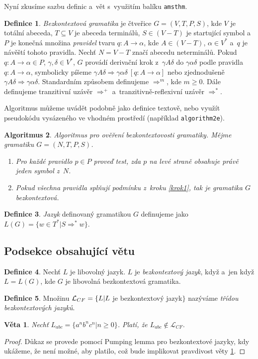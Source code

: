 \documentclass[a4paper, twocolumn, 11pt]{article}
\theoremstyle{definition}
\newtheorem{definice}{Definice}[section]
\theoremstyle{plain}
\newtheorem{algoritmus}[definice]{Algoritmus}
\theoremstyle{plain}
\newtheorem{veta}{Věta}
\begin{document}
	Nyní zkusíme sazbu definic a~vět s~využitím balíku \texttt{amsthm}.
	\begin{definice} \label{def:bezkont_gram}
		\emph{ Bezkontextová gramatika} je čtveřice $G=(V,T,P,S)$, kde $V$ je totální abeceda,
		$T \subseteq V$ je abeceda terminálů, $S \in (V - T)$ je startující symbol a~$P$ je konečná množina \emph{pravidel}
		tvaru $q\colon A \rightarrow \alpha$, kde $A \in (V - T)$, 
		$\alpha \in V^*$ a~$q$ je návěští tohoto pravidla. Nechť $N=V-T$ značí abecedu neterminálů.
		Pokud $q\colon A \rightarrow \alpha \in P$, $\gamma, \delta \in V^*$, $G$ provádí derivační krok z~$\gamma A \delta$ do $\gamma \alpha \delta$ podle pravidla $q \colon A \rightarrow \alpha$, sym\-bo\-li\-cky píšeme 
		$\gamma A \delta \Rightarrow \gamma \alpha \delta \ [q \colon A \rightarrow \alpha]$ nebo zjed\-nodušeně $\gamma A \delta \Rightarrow \gamma \alpha \delta$. Standardním způsobem definu\-jeme $\Rightarrow ^m$, kde $m \ge 0$. Dále definujeme 
		tranzitivní uzávěr $\Rightarrow ^+$ a~tranzitivně-reflexivní uzávěr $\Rightarrow ^*$.
	\end{definice}

	Algoritmus můžeme uvádět podobně jako definice \mbox{textově}, nebo využít pseudokódu vysázeného ve vhodném prostředí (například \texttt{algorithm2e}).

	\begin{algoritmus}
		Algoritmus pro ověření bezkontextovosti gramatiky. Mějme gramatiku $G = (N,T,P,S)$.
		\begin{enumerate}
			\item\label{krok1} Pro každé pravidlo $p \in P$ proveď test, zda $p$ na levé straně obsahuje právě jeden symbol z~$N$.
			\item Pokud všechna pravidla splňují podmínku z~kroku \ref{krok1}, tak je gramatika $G$ bezkontextová.
		\end{enumerate}
	\end{algoritmus}
	\begin{definice}
		\emph{ Jazyk} definovaný gramatikou $G$ definujeme jako $L(G)=\{w \in T^*|S \Rightarrow ^* w\}$.
	\end{definice}
	\subsection{Podsekce obsahující větu}
		\begin{definice}
			Nechť $L$ je libovolný jazyk. $L$ je \emph{bezkontextový jazyk}, když a~jen když $L=L(G)$, kde $G$ je libovolná bezkontextová gramatika.
		\end{definice}
		\begin{definice}
		Množinu $\mathcal{L}_{CF}=\{L|L\displaystyle$ je bezkontextový jazyk$\}$ nazýváme \emph{třídou bezkontextových jazyků}.
		\end{definice}
		\begin{veta}\label{nejakaveta}
			Nechť $L_{abc}=\{a^n b^n c^n | n \ge 0\}$. Platí, že $L_{abc} \notin \mathcal{L}_{CF}$.
		\end{veta}
		\begin{proof}
			Důkaz se provede pomocí Pumping lemma pro bezkontextové jazyky, kdy ukážeme, že není možné, aby platilo, což bude implikovat pravdivost věty \ref{nejakaveta}.
		\end{proof}
\end{document}
